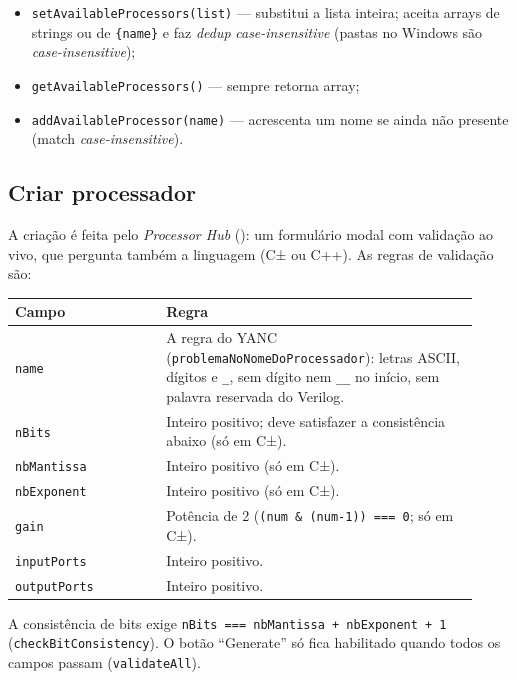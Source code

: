 \begin{itemize}[leftmargin=1.6em]
  \item \lstinline|setAvailableProcessors(list)| — substitui a lista inteira;
    aceita arrays de strings ou de \lstinline|{name}| e faz \emph{dedup}
    \emph{case-insensitive} (pastas no Windows são \emph{case-insensitive});
  \item \lstinline|getAvailableProcessors()| — sempre retorna array;
  \item \lstinline|addAvailableProcessor(name)| — acrescenta um nome se ainda
    não presente (match \emph{case-insensitive}).
\end{itemize}

\subsection{Criar processador}

A criação é feita pelo \emph{Processor Hub} ():
um formulário modal com validação ao vivo, que pergunta também a linguagem (C± ou
C++). As regras de validação são:

\begin{longtable}{p{0.30\linewidth} p{0.62\linewidth}}
  \toprule
  \textbf{Campo} & \textbf{Regra} \\
  \midrule
  \endhead
  \lstinline|name|         & A regra do YANC (\lstinline|problemaNoNomeDoProcessador|): letras ASCII, dígitos e \lstinline|_|, sem dígito nem \lstinline|__| no início, sem palavra reservada do Verilog. \\
  \lstinline|nBits|        & Inteiro positivo; deve satisfazer a consistência abaixo (só em C±). \\
  \lstinline|nbMantissa|   & Inteiro positivo (só em C±). \\
  \lstinline|nbExponent|   & Inteiro positivo (só em C±). \\
  \lstinline|gain|         & Potência de 2 (\lstinline|(num & (num-1)) === 0|; só em C±). \\
  \lstinline|inputPorts|   & Inteiro positivo. \\
  \lstinline|outputPorts|  & Inteiro positivo. \\
  \bottomrule
\end{longtable}

A consistência de bits exige \lstinline|nBits === nbMantissa + nbExponent + 1|
(\lstinline|checkBitConsistency|). O botão \enquote{Generate} só fica habilitado
quando todos os campos passam (\lstinline|validateAll|).


